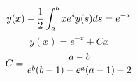 $$
y(x)-{1 \over 2}\int_a^b xe^s y(s) ds = e^{-x}
$$
$$
y(x)=e^{-x}+Cx
$$
$$
C={{a-b}\over{e^b(b-1)-e^a(a-1)-2}}
$$
